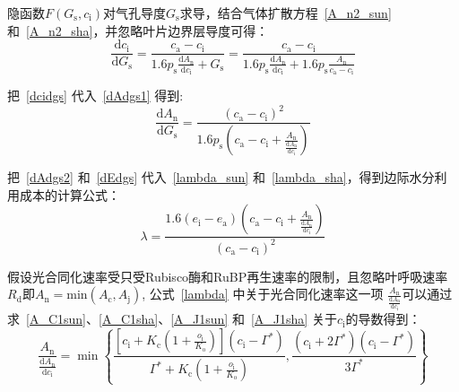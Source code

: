 隐函数$F\left(G_{\mathrm{s}},c_{\mathrm{i}}\right)$对气孔导度$G_{\mathrm{s}}$求导，结合气体扩散方程~\eqref{A_n2_sun}和~\eqref{A_n2_sha}，并忽略叶片边界层导度可得：
\begin{equation}\label{dcidgs}
    \frac{\mathrm{d}c_{\mathrm{i}}}{\mathrm{d}G_{\mathrm{s}}}=\frac{c_{\mathrm{a}}-c_{\mathrm{i}}}{1.6p_{\mathrm{s}}\frac{\mathrm{d}A_{\mathrm{n}}}{\mathrm{d}c_{\mathrm{i}}}+G_{\mathrm{s}}}=\frac{c_{\mathrm{a}}-c_{\mathrm{i}}}{1.6p_{\mathrm{s}}\frac{\mathrm{d}A_{\mathrm{n}}}{\mathrm{d}c_{\mathrm{i}}}+1.6p_{\mathrm{s}}\frac{A_{\mathrm{n}}}{c_{\mathrm{a}}-c_{\mathrm{i}}}}
\end{equation}

把~\eqref{dcidgs} 代入~\eqref{dAdgs1} 得到:
\begin{equation}\label{dAdgs2}
    \frac{\mathrm{d}A_{\mathrm{n}}}{\mathrm{d}G_{\mathrm{s}}}=\frac{\left(c_{\mathrm{a}}-c_{\mathrm{i}}\right)^2}{1.6p_{\mathrm{s}}\left(c_{\mathrm{a}}-c_{\mathrm{i}}+\frac{A_{\mathrm{n}}}{\frac{\mathrm{d}A_{\mathrm{n}}}{\mathrm{d}c_{\mathrm{i}}}}\right)}
\end{equation}

把~\eqref{dAdgs2} 和~\eqref{dEdgs} 代入~\eqref{lambda_sun} 和~\eqref{lambda_sha}，得到边际水分利用成本的计算公式：
\begin{equation}\label{lambda}
\lambda=\frac{1.6\left(e_{\mathrm{i}}-e_{\mathrm{a}}\right)\left(c_{\mathrm{a}}-c_{\mathrm{i}}+\frac{A_{\mathrm{n}}}{\frac{\mathrm{d}A_{\mathrm{n}}}{\mathrm{d}c_{\mathrm{i}}}}\right)}{\left(c_{\mathrm{a}}-c_{\mathrm{i}}\right)^2}
\end{equation}

假设光合同化速率受只受Rubisco酶和RuBP再生速率的限制，且忽略叶呼吸速率$R_{\mathrm{d}}$即$A_{\mathrm{n}}=\mathrm{min}\left(A_{\mathrm{c}},A_{\mathrm{j}}\right)$, 公式~\eqref{lambda} 中关于光合同化速率这一项 $\frac{A_{\mathrm{n}}}{\frac{\mathrm{d}A_{\mathrm{n}}}{\mathrm{d}c_{\mathrm{i}}}}$可以通过求~\eqref{A_C1sun}、\eqref{A_C1sha}、\eqref{A_J1sun} 和~\eqref{A_J1sha} 关于$c_{\mathrm{i}}$的导数得到：
%
\begin{equation}\label{AdAdci}
    \frac{A_{\mathrm{n}}}{\frac{\mathrm{d}A_{\mathrm{n}}}{\mathrm{d}c_{\mathrm{i}}}}=\min\left\{\frac{\left[c_{\mathrm{i}}+K_{\mathrm{c}}\left(1+\frac{o_{\mathrm{i}}}{K_{\mathrm{o}}}\right)\right]\left(c_{\mathrm{i}}-\Gamma^*\right)}{\Gamma^*+K_{\mathrm{c}}\left(1+\frac{o_{\mathrm{i}}}{K_{\mathrm{o}}}\right)},\frac{\left(c_{\mathrm{i}}+2\Gamma^*\right)\left(c_{\mathrm{i}}-\Gamma^*\right)}{3\Gamma^*}\right\}
\end{equation}

